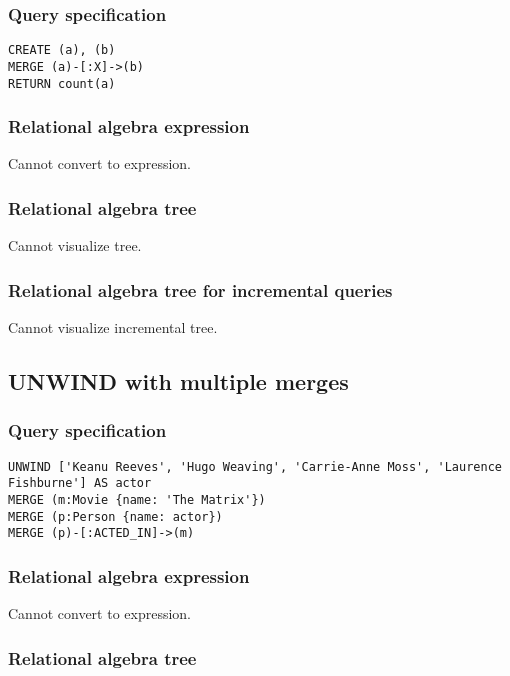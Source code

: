 \subsubsection*{Query specification}

\begin{lstlisting}
CREATE (a), (b)
MERGE (a)-[:X]->(b)
RETURN count(a)
\end{lstlisting}

\subsubsection*{Relational algebra expression}

Cannot convert to expression.

\subsubsection*{Relational algebra tree}

Cannot visualize tree.

\subsubsection*{Relational algebra tree for incremental queries}

Cannot visualize incremental tree.

\subsection{UNWIND with multiple merges}

\subsubsection*{Query specification}

\begin{lstlisting}
UNWIND ['Keanu Reeves', 'Hugo Weaving', 'Carrie-Anne Moss', 'Laurence Fishburne'] AS actor
MERGE (m:Movie {name: 'The Matrix'})
MERGE (p:Person {name: actor})
MERGE (p)-[:ACTED_IN]->(m)
\end{lstlisting}

\subsubsection*{Relational algebra expression}

Cannot convert to expression.

\subsubsection*{Relational algebra tree}

